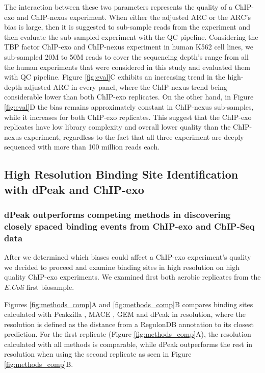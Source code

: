 \documentclass{bmcart}
\begin{document}
The interaction between these two parameters represents the quality of
a ChIP-exo and ChIP-nexus experiment. When either the adjusted
$\mbox{ARC}$ or the $\mbox{ARC}$'s bias is large, then it is suggested
to sub-sample reads from the experiment and then evaluate the
sub-sampled experiment with the QC pipeline. Considering the TBP
factor ChIP-exo \cite{venters13} and ChIP-nexus \cite{chipnexus}
experiment in human K562 cell lines, we sub-sampled 20M to 50M reads
to cover the sequencing depth's range from all the human experiments
that were considered in this study and evaluated them with QC
pipeline. Figure \ref{fig:eval}C exhibits an increasing trend in the
high-depth adjusted $\mbox{ARC}$ in every panel, where the ChIP-nexus
trend being considerable lower than both ChIP-exo replicates. On the
other hand, in Figure \ref{fig:eval}D the bias remains approximately
constant in ChIP-nexus sub-samples, while it increases for both
ChIP-exo replicates. This suggest that the ChIP-exo replicates have
low library complexity and overall lower quality than the ChIP-nexus
experiment, regardless to the fact that all three experiment are
deeply sequenced with more than 100 million reads each.

\subsection*{High Resolution Binding Site Identification with dPeak and
  ChIP-exo}

\subsubsection*{dPeak outperforms competing methods in discovering closely
  spaced binding events from ChIP-exo and ChIP-Seq data}

After we determined which biases could affect a ChIP-exo experiment's
quality we decided to proceed and examine binding sites in high
resolution on high quality ChIP-exo experiments. We examined first
both aerobic replicates from the \emph{E.Coli} first biosample.

Figures \ref{fig:methods_comp}A and \ref{fig:methods_comp}B compares
binding sites calculated with Peakzilla \cite{peakzilla}, MACE
\cite{mace}, GEM \cite{gem} and dPeak \cite{dpeak} in resolution,
where the resolution is defined as the distance from a RegulonDB
annotation to its closest prediction. For the first replicate (Figure
\ref{fig:methods_comp}A), the resolution calculated with all methods
is comparable, while dPeak outperforms the rest in resolution when
using the second replicate as seen in Figure \ref{fig:methods_comp}B. 
\end{document}
